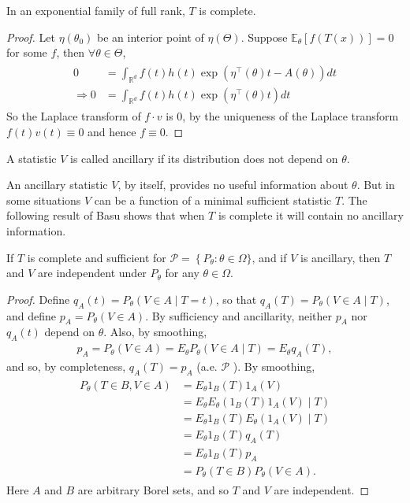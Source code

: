 \begin{thm}
    In an exponential family of full rank, $T$ is complete.
\end{thm}

\begin{proof}
    Let $\eta\left(\theta_0\right)$ be an interior point of $\eta(\Theta)$. Suppose $\mathbb{E}_\theta[f(T(x))]=0$ for some $f$, then $\forall \theta \in \Theta$,
\begin{align*}
\begin{aligned}
0 & =\int_{\mathbb{R}^d} f(t) h(t) \exp \left(\eta^{\top}(\theta) t-A(\theta)\right) d t \\
\Rightarrow 0 & =\int_{\mathbb{R}^d} f(t) h(t) \exp \left(\eta^{\top}(\theta) t\right) d t
\end{aligned}
\end{align*}
So the Laplace transform of $f \cdot v$ is 0, by the uniqueness of the Laplace transform $f(t) v(t)\equiv0$ and hence $f \equiv 0$.
\end{proof}

\begin{de}
    A statistic $V$ is called ancillary if its distribution does not depend on $\theta$. 
\end{de}

An ancillary statistic $V$, by itself, provides no useful information about $\theta$. But in some situations $V$ can be a function of a minimal sufficient statistic $T$. The following result of Basu shows that when $T$ is complete it will contain no ancillary information. 
\begin{thm}[Basu]
 If $T$ is complete and sufficient for $\mathcal{P}=\left\{P_\theta: \theta \in\right. \Omega\}$, and if $V$ is ancillary, then $T$ and $V$ are independent under $P_\theta$ for any $\theta \in \Omega$.
\end{thm}

\begin{proof}
    Define $q_A(t)=P_\theta(V \in A \mid T=t)$, so that $q_A(T)=P_\theta(V \in A \mid T)$, and define $p_A=P_\theta(V \in A)$. By sufficiency and ancillarity, neither $p_A$ nor $q_A(t)$ depend on $\theta$. Also, by smoothing,
\begin{align*}
p_A=P_\theta(V \in A)=E_\theta P_\theta(V \in A \mid T)=E_\theta q_A(T),
\end{align*}
and so, by completeness, $q_A(T)=p_A$ (a.e. $\mathcal{P}$ ). By smoothing,
\begin{align*}
\begin{aligned}
P_\theta(T \in B, V \in A) & =E_\theta 1_B(T) 1_A(V) \\
& =E_\theta E_\theta\left(1_B(T) 1_A(V) \mid T\right) \\
& =E_\theta 1_B(T) E_\theta\left(1_A(V) \mid T\right) \\
& =E_\theta 1_B(T) q_A(T) \\
& =E_\theta 1_B(T) p_A \\
& =P_\theta(T \in B) P_\theta(V \in A) .
\end{aligned}
\end{align*}
Here $A$ and $B$ are arbitrary Borel sets, and so $T$ and $V$ are independent.
\end{proof}


